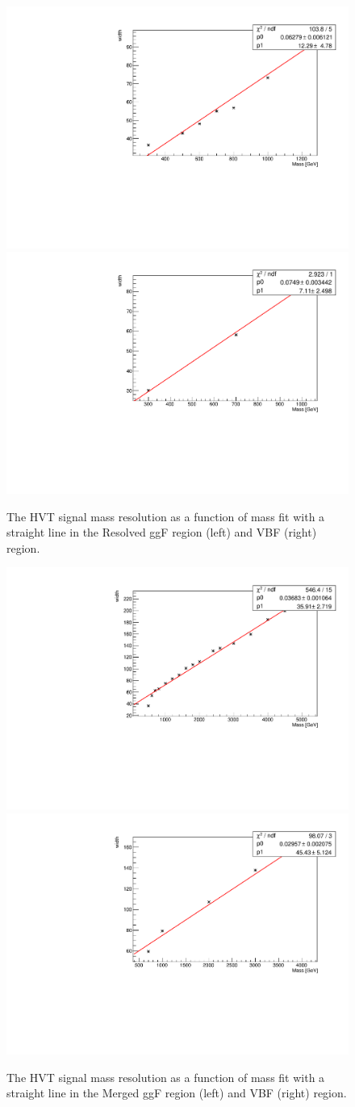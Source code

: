 \begin{figure}[h!]
  \centering
  \includegraphics[width=0.48\hsize]{figures/Analysis/signal_mass_resolution/sigres_resolved_1lephvt.pdf}
    \includegraphics[width=0.48\hsize]{figures/Analysis/signal_mass_resolution/sigres_resolved_1lephvtvbf.pdf}
 \caption{The HVT signal mass resolution as a function of mass fit with a straight line in the Resolved ggF region (left) and VBF (right) region. } 
  \label{fig:resolved_sigwidth}
\end{figure} 
\FloatBarrier

\begin{figure}[h!]
  \centering
  \includegraphics[width=0.48\hsize]{figures/Analysis/signal_mass_resolution/sigres_merged_1lephvt.pdf}
    \includegraphics[width=0.48\hsize]{figures/Analysis/signal_mass_resolution/sigres_merged_1lephvtvbf.pdf}
 \caption{The HVT signal mass resolution as a function of mass fit with a straight line in the Merged ggF region (left) and VBF (right) region. } 
  \label{fig:merged_sigwidth}
\end{figure} 
\FloatBarrier

